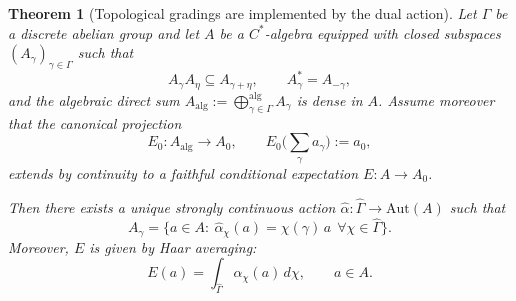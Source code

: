 \documentclass[11pt]{amsart}
\theoremstyle{plain}
\newtheorem{theorem}{Theorem}[section]
\theoremstyle{definition}
\theoremstyle{remark}
\begin{document}
\begin{theorem}[Topological gradings are implemented by the dual action]\label{thm:D}
Let $\Gamma$ be a discrete abelian group and let $A$ be a $C^*$-algebra equipped with closed subspaces $(A_\gamma)_{\gamma\in\Gamma}$ such that
\[
A_\gamma A_\eta\subseteq A_{\gamma+\eta},\qquad A_\gamma^*=A_{-\gamma},
\]
and the algebraic direct sum $A_{\mathrm{alg}}:=\bigoplus_{\gamma\in\Gamma}^{\mathrm{alg}}A_\gamma$ is dense in $A$.
Assume moreover that the canonical projection
\[
E_0:A_{\mathrm{alg}}\to A_0,\qquad E_0\Big(\sum_{\gamma}a_\gamma\Big):=a_0,
\]
extends by continuity to a faithful conditional expectation $E:A\to A_0$.

Then there exists a unique strongly continuous action $\widehat\alpha:\widehat\Gamma\to\mathrm{Aut}(A)$ such that
\[
A_\gamma=\{a\in A:\ \widehat\alpha_\chi(a)=\chi(\gamma)\,a\ \ \forall \chi\in\widehat\Gamma\}.
\]
Moreover, $E$ is given by Haar averaging:
\[
E(a)=\int_{\widehat\Gamma}\widehat\alpha_\chi(a)\,d\chi,\qquad a\in A.
\]
\end{theorem}
\end{document}
